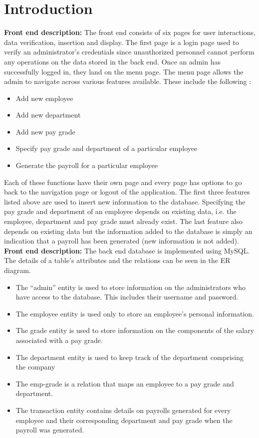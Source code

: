 \documentclass[12pt]{article}
\begin{document}
\section{Introduction}  %
\textbf{Front end description:}
\newline
\newline
The front end consists of six pages for user interactions, data verification, insertion and display. The first page is a login page used to verify an administrator's credentials since unauthorized personnel cannot perform any operations on the data stored in the back end. Once an admin has successfully logged in, they land on the menu page.
\newline
\newline
The menu page allows the admin to navigate across various features available. These include the following :
\begin{itemize}
    \item Add new employee
    \item Add new department
    \item Add new pay grade
    \item Specify pay grade and department of a particular employee
    \item Generate the payroll for a particular employee
\end{itemize}
Each of these functions have their own page and every page has options to go back to the navigation page or logout of the application.
\newline
\newline
The first three features listed above are used to insert new information to the database. Specifying the pay grade and department of an employee depends on existing data, i.e. the employee, department and pay grade must already exist. The last feature also depends on existing data but the information added to the database is simply an indication that a payroll has been generated (new information is not added).
\newpage
\noindent
\textbf{Front end description:}
\newline
\newline
The back end database is implemented using MySQL. The details of a table's attributes and the relations can be seen in the ER diagram.
\begin{itemize}
    \item The “admin” entity is used to store information on the administrators who have access to the database. This includes their username and password.
    \item The employee entity is used only to store an employee’s personal information.
    \item The grade entity is used to store information on the components of the salary associated with a pay grade.
    \item The department entity is used to keep track of the department comprising the company
    \item The emp-grade is a relation that maps an employee to a pay grade and department.
    \item The transaction entity contains details on payrolls generated for every employee and their corresponding department and pay grade when the payroll was generated.
\end{itemize}
\end{document}
